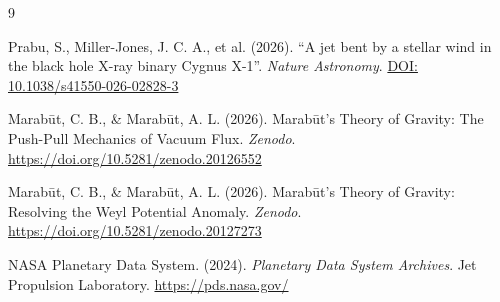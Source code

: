 \documentclass[11pt, a4paper]{article}
\newcommand{\doi}[1]{\href{https://doi.org/#1}{DOI: #1}}
\begin{document}
\clearpage
\begin{thebibliography}{9}

  Prabu, S., Miller-Jones, J. C. A., et al. (2026). ``A jet bent by a stellar wind in the black hole X-ray binary Cygnus X-1''. \textit{Nature Astronomy}.
  \doi{10.1038/s41550-026-02828-3}

  Marab\={u}t, C. B., \& Marab\={u}t, A. L. (2026). Marab\={u}t's Theory of Gravity: The Push-Pull Mechanics of Vacuum Flux. \textit{Zenodo}.
  \url{https://doi.org/10.5281/zenodo.20126552}

  Marab\={u}t, C. B., \& Marab\={u}t, A. L. (2026). Marab\={u}t's Theory of Gravity: Resolving the Weyl Potential Anomaly. \textit{Zenodo}.
  \url{https://doi.org/10.5281/zenodo.20127273}

  NASA Planetary Data System. (2024). \textit{Planetary Data System Archives}. Jet Propulsion Laboratory. \url{https://pds.nasa.gov/}

\end{thebibliography}
\end{document}
